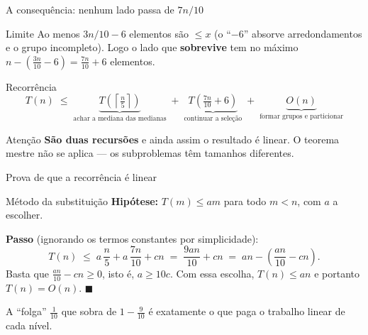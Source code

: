 \documentclass[aspectratio=169]{beamer}
\begin{document}
\begin{frame}{A consequência: nenhum lado passa de $7n/10$}
  \begin{block}{Limite}
    Ao menos $3n/10 - 6$ elementos são $\le x$ (o ``$-6$'' absorve
    arredondamentos e o grupo incompleto). Logo o lado que \textbf{sobrevive}
    tem no máximo
    $n - \left(\frac{3n}{10} - 6\right) = \frac{7n}{10} + 6$ elementos.
  \end{block}

  \begin{block}{Recorrência}
    \[
      T(n) \;\le\;
      \underbrace{T\!\left(\left\lceil \tfrac{n}{5} \right\rceil\right)}_{\text{achar a mediana das medianas}}
      \;+\;
      \underbrace{T\!\left(\tfrac{7n}{10} + 6\right)}_{\text{continuar a seleção}}
      \;+\;
      \underbrace{O(n)}_{\text{formar grupos e particionar}}
    \]
  \end{block}

  \begin{exampleblock}{Atenção}
    \textbf{São duas recursões} e ainda assim o resultado é linear. O teorema
    mestre não se aplica --- os subproblemas têm tamanhos diferentes.
  \end{exampleblock}
\end{frame}

\begin{frame}{Prova de que a recorrência é linear}
  \begin{block}{Método da substituição}
    \textbf{Hipótese:} $T(m) \le am$ para todo $m < n$, com $a$ a escolher.

    \medskip
    \textbf{Passo} (ignorando os termos constantes por simplicidade):
    \[
      T(n) \;\le\; a\,\frac{n}{5} + a\,\frac{7n}{10} + cn
            \;=\; \frac{9an}{10} + cn
            \;=\; an - \left(\frac{an}{10} - cn\right).
    \]
    Basta que $\frac{an}{10} - cn \ge 0$, isto é, $a \ge 10c$. Com essa
    escolha, $T(n) \le an$ e portanto $T(n) = O(n)$. \hfill $\blacksquare$
  \end{block}

  \begin{center}
    \small A ``folga'' $\tfrac{1}{10}$ que sobra de $1 - \tfrac{9}{10}$ é
    exatamente o que paga o trabalho linear de cada nível.
  \end{center}
\end{frame}
\end{document}
